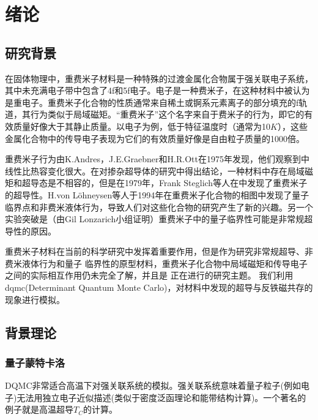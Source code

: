 \section{绪论}
\subsection{研究背景}
在固体物理中，重费米子材料是一种特殊的过渡金属化合物属于强关联电子系统，其中未充满电子带中包含了4f和5f电子。电子是一种费米子，在这种材料中被认为是重电子。重费米子化合物的性质通常来自稀土或锕系元素离子的部分填充的f轨道，其行为类似于局域磁矩。“重费米子”这个名字来自于费米子的行为，即它的有效质量好像大于其静止质量。以电子为例，低于特征温度时（通常为10$K$），这些金属化合物中的传导电子表现为它们的有效质量好像是自由粒子质量的1000倍。

重费米子行为由K.Andres，J.E.Graebner和H.R.Ott在1975年发现，他们观察到中线性比热容变化很大。在对掺杂超导体的研究中得出结论，一种材料中存在局域磁矩和超导态是不相容的，但是在1979年，Frank Steglich等人在中发现了重费米子的超导性。H.von Löhneysen等人于1994年在重费米子化合物的相图中发现了量子临界点和非费米液体行为，导致人们对这些化合物的研究产生了新的兴趣。另一个实验突破是（由Gil Lonzarich小组证明）重费米子中的量子临界性可能是非常规超导性的原因。

重费米子材料在当前的科学研究中发挥着重要作用，但是作为研究非常规超导、非费米液体行为和量子
临界性的原型材料，重费米子化合物中局域磁矩和传导电子之间的实际相互作用仍未完全了解，并且是
正在进行的研究主题。
我们利用dqmc(Determinant Quantum Monte Carlo)，对材料中发现的超导与反铁磁共存的现象进行模拟。

\subsection{背景理论}
\subsubsection{量子蒙特卡洛}
DQMC非常适合高温下对强关联系统的模拟。强关联系统意味着量子粒子(例如电子)无法用独立电子近似描述(类似于密度泛函理论和能带结构计算)。一个著名的例子就是高温超导$T_C$的计算。

